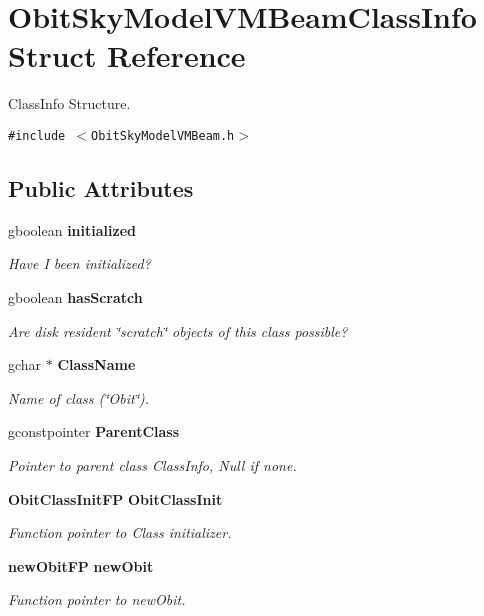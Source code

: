 \section{Obit\-Sky\-Model\-VMBeam\-Class\-Info Struct Reference}
\label{structObitSkyModelVMBeamClassInfo}
Class\-Info Structure.  


{\tt \#include $<$Obit\-Sky\-Model\-VMBeam.h$>$}

\subsection*{Public Attributes}
\begin{CompactItemize}
\item 
gboolean {\bf initialized}
\begin{CompactList}\small\item\em Have I been initialized? \item\end{CompactList}\item 
gboolean {\bf has\-Scratch}
\begin{CompactList}\small\item\em Are disk resident \char`\"{}scratch\char`\"{} objects of this class possible? \item\end{CompactList}\item 
gchar $\ast$ {\bf Class\-Name}
\begin{CompactList}\small\item\em Name of class (\char`\"{}Obit\char`\"{}). \item\end{CompactList}\item 
gconstpointer {\bf Parent\-Class}
\begin{CompactList}\small\item\em Pointer to parent class Class\-Info, Null if none. \item\end{CompactList}\item 
{\bf Obit\-Class\-Init\-FP} {\bf Obit\-Class\-Init}
\begin{CompactList}\small\item\em Function pointer to Class initializer. \item\end{CompactList}\item 
{\bf new\-Obit\-FP} {\bf new\-Obit}
\begin{CompactList}\small\item\em Function pointer to new\-Obit. \item\end{CompactList}\item 

\end{CompactItemize}
